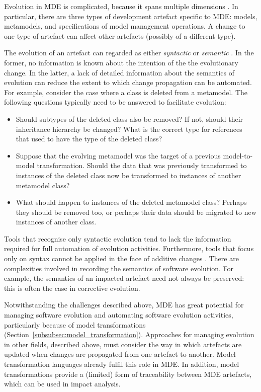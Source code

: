 Evolution \cc in MDE is complicated, because it spans multiple dimensions \cite{deursen07mdse}. In particular, there are three types of development artefact specific to MDE: models, metamodels, and specifications of model management operations. A change to one type of artefact can affect other artefacts (possibly of a different type). 

The \cc evolution of an artefact can regarded as either \emph{syntactic} or \emph{semantic} \cite{sprinkle04domain}. In the former, no information is known about the intention of the the evolutionary change. In the latter, a lack of detailed information about the semantics of evolution can reduce the extent to which change propagation can be automated. For example, consider the case where a class is deleted from a metamodel. The following questions typically need to be answered to facilitate evolution:
 \begin{itemize}
  \item Should subtypes of the deleted class also be removed? If not, should their inheritance hierarchy be changed? What is the correct type for references that used to have the type of the deleted class?
  \item Suppose that the evolving metamodel was the target of a previous model-to-model transformation. Should the data that was previously transformed to instances of the deleted class now be transformed to instances of another metamodel class?
  \item What should happen to instances of the deleted metamodel class? Perhaps they should be removed too, or perhaps their data should be migrated to new instances of another class.
 \end{itemize}

Tools that recognise only syntactic evolution tend to lack the information required for full automation of evolution activities. Furthermore, tools that focus only on syntax cannot be applied in the face of additive changes \cite{gruschko07towards}. There are complexities involved in recording the semantics of software evolution. For example, the semantics of an impacted artefact need not always be preserved: this is often the case in corrective evolution.

Notwithstanding the challenges described above, MDE has great potential for managing software evolution and automating software evolution activities, particularly because of model transformations (Section~\ref{subsubsec:model_transformation}). Approaches for managing evolution in other fields, described above, must consider the way in which artefacts are updated when changes are propagated from one artefact to another. Model transformation languages already fulfil this role in MDE. In addition, model transformations provide a (limited) form of traceability between MDE artefacts, which can be used in impact analysis.

